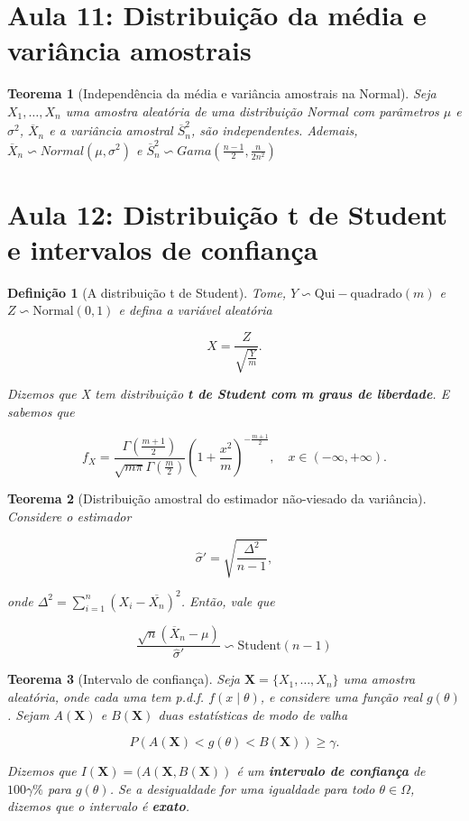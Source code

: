 \documentclass{article}
\newtheorem{theorem}{Teorema}
\newtheorem{definition}{Definição}
\begin{document}
\section*{Aula 11: Distribuição da média e variância amostrais}
\label{s11}
\begin{theorem}[Independência da média e variância amostrais na Normal]
Seja $X_1, \ldots, X_n$ uma amostra aleatória de uma distribuição Normal com parâmetros $\mu$ e $\sigma^2$, $\overline{X}_n$ e a variância amostral $\overline{S}_n^2$, são independentes. Ademais, $\overline{X}_n \backsim Normal \left ( \mu, \sigma^2 \right )$ e $\overline{S}_n^2 \backsim Gama \left ( \frac{n - 1}{2}, \frac{n}{2 n^2} \right )$
\end{theorem}

\section*{Aula 12: Distribuição t de Student  e intervalos de confiança}
\label{s12}
\begin{definition}[A distribuição t de Student]
Tome, $Y \backsim \mathrm{Qui-quadrado}(m)$ e $Z \backsim \mathrm{Normal}(0, 1)$ e defina a variável aleatória

$$X = \frac{Z}{\sqrt{\frac{Y}{m}}}.$$

Dizemos que X tem distribuição \textbf{t de Student com m graus de liberdade}. E sabemos que

$$f_X = \frac{\Gamma(\frac{m + 1}{2})}{\sqrt{m \pi} \Gamma(\frac{m}{2})} \left ( 1 + \frac{x^2}{m} \right )^{-\frac{m + 1}{2}}, \quad x \in (-\infty, + \infty).$$
\end{definition}

\begin{theorem}[Distribuição amostral do estimador não-viesado da variância]

Considere o estimador

$$\hat{\sigma}' = \sqrt{\frac{\Delta^2}{n - 1}},$$

onde $\Delta^2 = \sum_{i = 1}^n (X_i - \overline{X_n})^2$. Então, vale que

$$\frac{\sqrt{n} (\overline{X}_n - \mu)}{\hat{\sigma}'} \backsim \mathrm{Student}(n - 1)$$
\end{theorem}

\begin{theorem}[Intervalo de confiança]
Seja $\textbf{X} = \{ X_1, \ldots, X_n \}$ uma amostra aleatória, onde cada uma tem p.d.f. $f(x \mid \theta)$, e considere uma função real $g(\theta)$. Sejam $A(\textbf{X})$ e $B(\textbf{X})$ duas estatísticas de modo de valha

\begin{equation}
    P(A(\textbf{X}) < g(\theta) < B(\textbf{X})) \geq \gamma.
\end{equation}

Dizemos que $I(\textbf{X}) = (A(\textbf{X},B(\textbf{X}))$ é um \textbf{intervalo de confiança} de $100 \gamma \%$ para $g(\theta)$. Se a desigualdade for uma igualdade para todo $\theta \in \Omega$, dizemos que o intervalo é \textbf{exato}.
\end{theorem}
\end{document}
